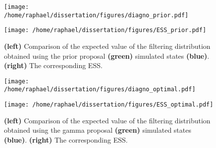 \documentclass{article}
\begin{document}
\begin{figure}[htb]
	\centering
	\begin{minipage}{.45\textwidth}
		\centering
		\texttt{[image: /home/raphael/dissertation/figures/diagno\_prior.pdf]}
	\end{minipage}
	\begin{minipage}{.45\textwidth}
		\centering
		\texttt{[image: /home/raphael/dissertation/figures/ESS\_prior.pdf]}
	\end{minipage}
	\caption{\textbf{(left)} Comparison of the expected value of the filtering distribution obtained using the prior proposal \textbf{(green)} simulated states \textbf{(blue)}. \textbf{(right)} The corresponding ESS. }
	\label{fig:prior}
\end{figure}

\begin{figure}[htb]
	\centering
	\begin{minipage}{.45\textwidth}
		\centering
		\texttt{[image: /home/raphael/dissertation/figures/diagno\_optimal.pdf]}
	\end{minipage}
	\begin{minipage}{.45\textwidth}
		\centering
		\texttt{[image: /home/raphael/dissertation/figures/ESS\_optimal.pdf]}
	\end{minipage}
	\caption{\textbf{(left)} Comparison of the expected value of the filtering distribution obtained using the gamma proposal \textbf{(green)} simulated states \textbf{(blue)}. \textbf{(right)} The corresponding ESS. }
	\label{fig:gamma}
\end{figure}
\end{document}
